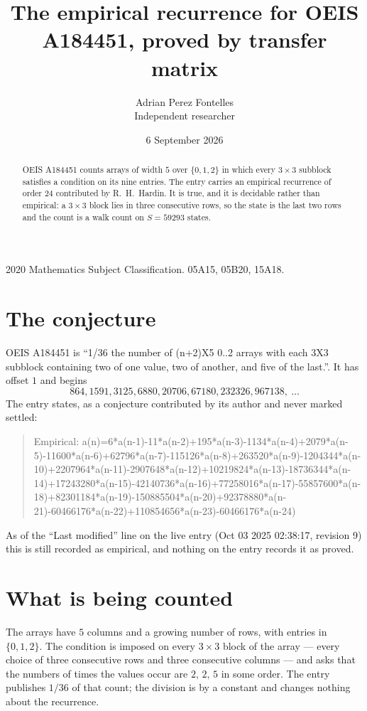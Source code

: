 \documentclass[11pt,a4paper]{article}
\title{The empirical recurrence for OEIS A184451, proved by transfer matrix}
\author{Adrian Perez Fontelles\\ \small Independent researcher}
\date{6 September 2026}
\theoremstyle{plain}
\theoremstyle{definition}
\begin{document}
\maketitle

\begin{abstract}
OEIS A184451 counts arrays of width $5$ over $\{0,1,2\}$ in which every $3\times3$ subblock
satisfies a condition on its nine entries. The entry carries an empirical recurrence of order
$24$ contributed by R.~H.~Hardin. It is true, and it is decidable rather than empirical: a
$3\times3$ block lies in three consecutive rows, so the state is the last two rows and the
count is a walk count on $S=59293$ states.
\end{abstract}

\noindent\small 2020 Mathematics Subject Classification. 05A15, 05B20, 15A18.\normalsize

\section{The conjecture}

OEIS A184451 is ``1/36 the number of (n+2)X5 0..2 arrays with each 3X3 subblock containing two of one value, two of another, and five of the last.''. It has offset $1$ and begins
\[
864, 1591, 3125, 6880, 20706, 67180, 232326, 967138,\ \dots
\]
The entry states, as a conjecture contributed by its author and never marked settled:
\begin{quote}
Empirical: a(n)=6*a(n-1)-11*a(n-2)+195*a(n-3)-1134*a(n-4)+2079*a(n-5)-11600*a(n-6)+62796*a(n-7)-115126*a(n-8)+263520*a(n-9)-1204344*a(n-10)+2207964*a(n-11)-2907648*a(n-12)+10219824*a(n-13)-18736344*a(n-14)+17243280*a(n-15)-42140736*a(n-16)+77258016*a(n-17)-55857600*a(n-18)+82301184*a(n-19)-150885504*a(n-20)+92378880*a(n-21)-60466176*a(n-22)+110854656*a(n-23)-60466176*a(n-24)
\end{quote}
As of the ``Last modified'' line on the live entry (Oct 03 2025 02:38:17, revision 9) this is still
recorded as empirical, and nothing on the entry records it as proved.

\section{What is being counted}

The arrays have $5$ columns and a growing number of rows, with entries in $\{0,1,2\}$. The
condition is imposed on every $3\times3$ block of the array --- every choice of three
consecutive rows and three consecutive columns --- and asks that the numbers of times the values occur are $2,\,2,\,5$ in some order. The entry publishes $1/36$ of that count; the division is by a constant and changes nothing about the recurrence.
\end{document}
